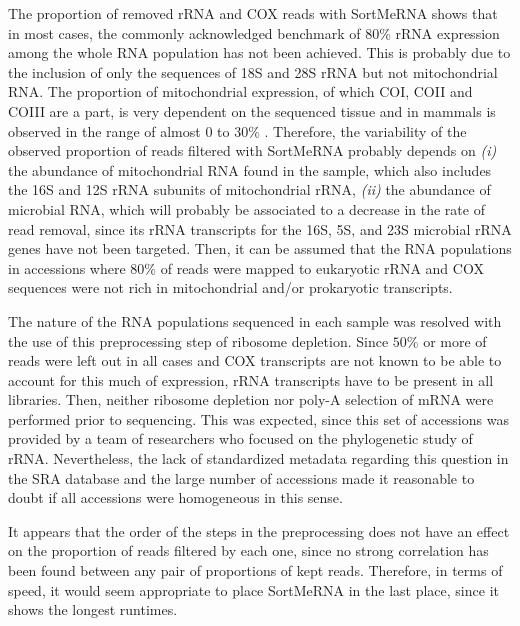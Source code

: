 \documentclass[
  openany]{book}
\begin{document}
The proportion of removed rRNA and COX reads with SortMeRNA shows that in most cases, the commonly acknowledged benchmark of \(80\%\) rRNA expression among the whole RNA population has not been achieved. This is probably due to the inclusion of only the sequences of 18S and 28S rRNA but not mitochondrial RNA. The proportion of mitochondrial expression, of which COI, COII and COIII are a part, is very dependent on the sequenced tissue and in mammals is observed in the range of almost 0 to \(30\%\) \autocite{Mercer2011,Osorio2021}. Therefore, the variability of the observed proportion of reads filtered with SortMeRNA probably depends on \emph{(i)} the abundance of mitochondrial RNA found in the sample, which also includes the 16S and 12S rRNA subunits of mitochondrial rRNA, \emph{(ii)} the abundance of microbial RNA, which will probably be associated to a decrease in the rate of read removal, since its rRNA transcripts for the 16S, 5S, and 23S microbial rRNA genes have not been targeted. Then, it can be assumed that the RNA populations in accessions where \(80\%\) of reads were mapped to eukaryotic rRNA and COX sequences were not rich in mitochondrial and/or prokaryotic transcripts.

The nature of the RNA populations sequenced in each sample was resolved with the use of this preprocessing step of ribosome depletion. Since \(50\%\) or more of reads were left out in all cases and COX transcripts are not known to be able to account for this much of expression, rRNA transcripts have to be present in all libraries. Then, neither ribosome depletion nor poly-A selection of mRNA were performed prior to sequencing. This was expected, since this set of accessions was provided by a team of researchers who focused on the phylogenetic study of rRNA. Nevertheless, the lack of standardized metadata regarding this question in the SRA database and the large number of accessions made it reasonable to doubt if all accessions were homogeneous in this sense.

It appears that the order of the steps in the preprocessing does not have an effect on the proportion of reads filtered by each one, since no strong correlation has been found between any pair of proportions of kept reads. Therefore, in terms of speed, it would seem appropriate to place SortMeRNA in the last place, since it shows the longest runtimes.
\end{document}
